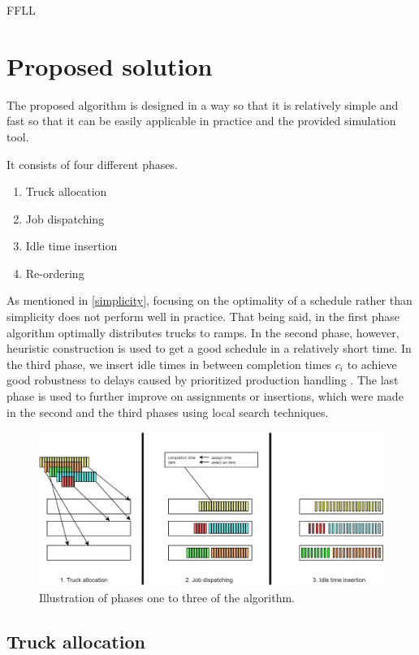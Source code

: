 \documentclass{ctuthesis}
\begin{document}
FFLL 


\chapter{Proposed solution}
\label{ch:Proposed solution}

The proposed algorithm is designed in a way so that it is relatively simple and fast so that it can be easily applicable in practice and the provided simulation tool.

It consists of four different phases.

\begin{enumerate}
    \item Truck allocation
    \item Job dispatching
    \item Idle time insertion
    \item Re-ordering
\end{enumerate}

As mentioned in \ref{simplicity}, focusing on the optimality of a schedule rather than simplicity does not perform well in practice. That being said, in the first phase algorithm optimally distributes trucks to ramps. In the second phase, however, heuristic construction is used to get a good schedule in a relatively short time. In the third phase, we insert idle times in between completion times $c_i$ to achieve good robustness to delays caused by prioritized production handling \cite{pinedo}. The last phase is used to further improve on assignments or insertions, which were made in the second and the third phases using local search techniques.

\begin{figure}[h]
\includegraphics[width=1.0\linewidth]{algo.jpg}
\caption{Illustration of phases one to three of the algorithm.}
\end{figure}

\section{Truck allocation}
\end{document}

